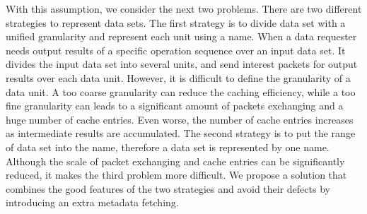 With this assumption, we consider the next two problems.  
There are two different strategies to represent data sets.  
The first strategy is to divide data set with a unified granularity and represent each unit using a name.  
When a data requester needs output results of a specific operation sequence over an input data set.  
It divides the input data set into several units, and send {\sc interest} packets for output results over each data unit.  
However, it is difficult to define the granularity of a data unit.  
A too coarse granularity can reduce the caching efficiency, while a too fine granularity can leads to a significant amount of packets exchanging and a huge number of cache entries.
Even worse, the number of cache entries increases as intermediate results are accumulated.  
The second strategy is to put the range of data set into the name, therefore a data set is represented by one name.  
Although the scale of packet exchanging and cache entries can be significantly reduced, it makes the third problem more difficult.  
We propose a solution that combines the good features of the two strategies and avoid their defects by introducing an extra metadata fetching.

